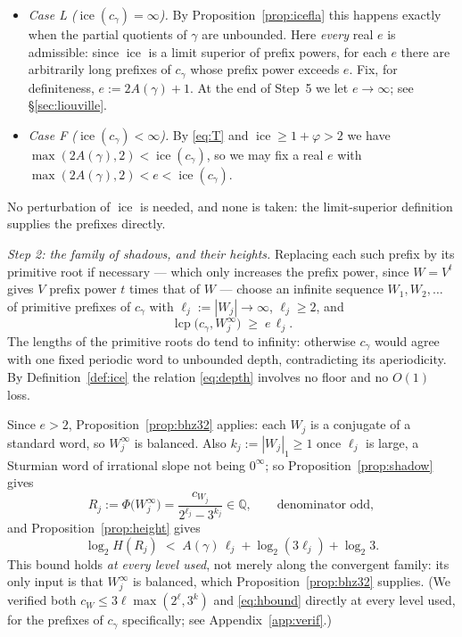 \documentclass[11pt,reqno]{amsart}
\theoremstyle{plain}
\theoremstyle{definition}
\DeclareMathOperator{\lcp}{lcp}
\DeclareMathOperator{\ice}{ice}
\newcommand{\Q}{\mathbb{Q}}
\newcommand{\PH}{\Phi}
\newcommand{\Av}{A(\gamma)}
\begin{document}
\begin{itemize}
\item \emph{Case L ($\ice(c_\gamma)=\infty$).} By Proposition~\ref{prop:icefla} this happens exactly
  when the partial quotients of $\gamma$ are unbounded. Here \emph{every} real $e$ is admissible:
  since $\ice$ is a limit superior of prefix powers, for each $e$ there are arbitrarily long
  prefixes of $c_\gamma$ whose prefix power exceeds $e$. Fix, for definiteness,
  $e:=2\Av+1$. At the end of Step~5 we let $e\to\infty$; see \S\ref{sec:liouville}.
\item \emph{Case F ($\ice(c_\gamma)<\infty$).} By \eqref{eq:T} and $\ice\ge1+\varphi>2$ we have
  $\max(2\Av,2)<\ice(c_\gamma)$, so we may fix a real $e$ with $\max(2\Av,2)<e<\ice(c_\gamma)$.
\end{itemize}

No perturbation of $\ice$ is needed, and none is taken: the limit-superior definition supplies the
prefixes directly.

\emph{Step 2: the family of shadows, and their heights.} Replacing each such prefix by its
primitive root if necessary --- which only increases the prefix power, since $W=V^{t}$ gives $V$
prefix power $t$ times that of $W$ --- choose an infinite sequence $W_1,W_2,\dots$ of primitive
prefixes of $c_\gamma$ with $\ell_j:=|W_j|\to\infty$, $\ell_j\ge2$, and
\begin{equation}\label{eq:depth}
  \lcp\bigl(c_\gamma,W_j^{\infty}\bigr)\;\ge\;e\,\ell_j .
\end{equation}
The lengths of the primitive roots do tend to infinity: otherwise $c_\gamma$ would agree with one
fixed periodic word to unbounded depth, contradicting its aperiodicity. By
Definition~\ref{def:ice} the relation \eqref{eq:depth} involves no floor and no $O(1)$ loss.

Since $e>2$, Proposition~\ref{prop:bhz32} applies: each $W_j$ is a conjugate of a standard word, so
$W_j^{\infty}$ is balanced. Also $k_j:=|W_j|_1\ge1$ once $\ell_j$ is large, a Sturmian word of
irrational slope not being $0^{\infty}$; so Proposition~\ref{prop:shadow} gives
\begin{equation}\label{eq:Rj}
  R_j:=\PH\bigl(W_j^{\infty}\bigr)=\frac{c_{W_j}}{2^{\ell_j}-3^{k_j}}\in\Q,
  \qquad\text{denominator odd},
\end{equation}
and Proposition~\ref{prop:height} gives
\begin{equation}\label{eq:hbound}
  \log_2 H(R_j)\;<\;\Av\,\ell_j+\log_2(3\ell_j)+\log_2 3 .
\end{equation}
This bound holds \emph{at every level used}, not merely along the convergent family: its only input
is that $W_j^{\infty}$ is balanced, which Proposition~\ref{prop:bhz32} supplies. (We verified both
$c_W\le3\ell\max(2^{\ell},3^{k})$ and \eqref{eq:hbound} directly at every level used, for the
prefixes of $c_\gamma$ specifically; see Appendix~\ref{app:verif}.)
\end{document}
